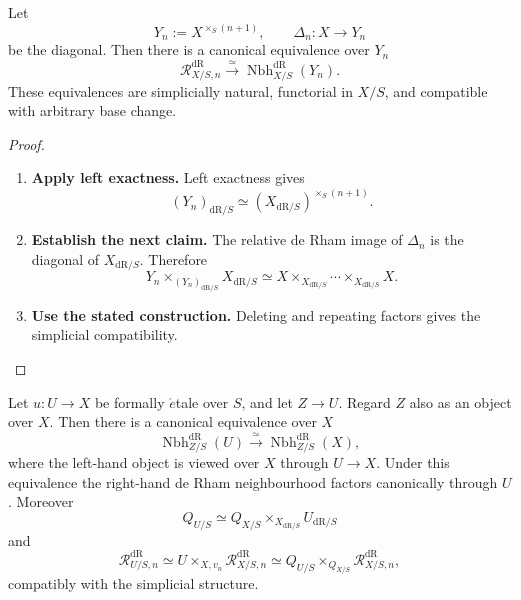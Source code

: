 \begin{theorem}
\label{thm:simplices-as-neighbourhoods}
Let
\[
  Y_n:=X^{\times_S(n+1)},
  \qquad
  \Delta_n:X\to Y_n
\]
be the diagonal. Then there is a canonical equivalence over \(Y_n\)
\[
  \mathcal R^{\mathrm{dR}}_{X/S,n}
  \xrightarrow{\simeq}
  \operatorname{Nbh}^{\mathrm{dR}}_{X/S}(Y_n).
\]
These equivalences are simplicially natural, functorial in \(X/S\), and compatible
with arbitrary base change.
\end{theorem}

\begin{proof}
\leavevmode
\begin{enumerate}[label=\textup{(\arabic*)}]
    \item \textbf{Apply left exactness.}
    Left exactness gives
    \[
    (Y_n)_{\mathrm{dR}/S}
    \simeq
    (X_{\mathrm{dR}/S})^{\times_S(n+1)}.
    \]
    \item \textbf{Establish the next claim.}
    The relative de Rham image of \(\Delta_n\) is the diagonal of
    \(X_{\mathrm{dR}/S}\).
    Therefore
    \[
    Y_n\times_{(Y_n)_{\mathrm{dR}/S}}X_{\mathrm{dR}/S}
    \simeq
    X\times_{X_{\mathrm{dR}/S}}\cdots\times_{X_{\mathrm{dR}/S}}X.
    \]
    \item \textbf{Use the stated construction.}
    Deleting and repeating factors gives the simplicial compatibility.
\end{enumerate}
\end{proof}

\begin{theorem}
\label{thm:formal-etale-neighbourhood-invariance}
Let \(u:U\to X\) be formally \(\acute{e}\)tale over \(S\), and let
\(Z\to U\). Regard \(Z\) also as an object over \(X\). Then there is a
canonical equivalence over \(X\)
\[
  \operatorname{Nbh}^{\mathrm{dR}}_{Z/S}(U)
  \xrightarrow{\simeq}
  \operatorname{Nbh}^{\mathrm{dR}}_{Z/S}(X),
\]
where the left-hand object is viewed over \(X\) through \(U\to X\). Under this
equivalence the right-hand de Rham neighbourhood factors canonically through \(U\).
Moreover
\[
  Q_{U/S}
  \simeq
  Q_{X/S}\times_{X_{\mathrm{dR}/S}}U_{\mathrm{dR}/S}
\]
and
\[
  \mathcal R^{\mathrm{dR}}_{U/S,n}
  \simeq
  U\times_{X,v_n}\mathcal R^{\mathrm{dR}}_{X/S,n}
  \simeq
  Q_{U/S}\times_{Q_{X/S}}\mathcal R^{\mathrm{dR}}_{X/S,n},
\]
compatibly with the simplicial structure.
\end{theorem}

